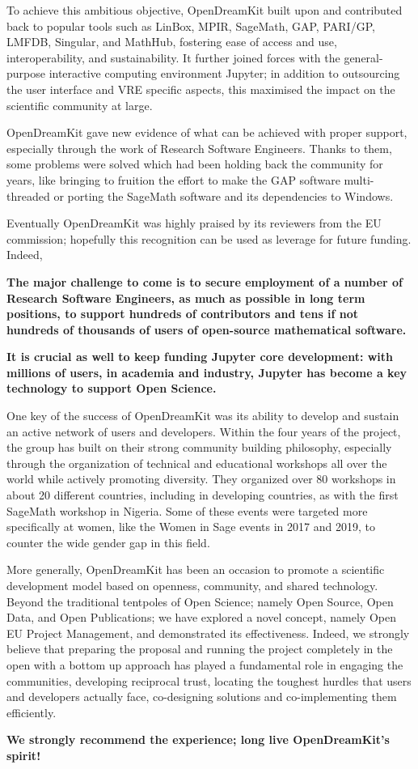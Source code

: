 To achieve this ambitious objective, OpenDreamKit built upon and contributed back to popular tools such as LinBox, MPIR, 
SageMath, GAP, PARI/GP, LMFDB, Singular, and MathHub, fostering ease of access and use, interoperability, and sustainability. 
It further joined forces with the general-purpose interactive computing environment Jupyter; in addition to outsourcing the 
user interface and VRE specific aspects, this maximised the impact on the scientific community at large.

OpenDreamKit gave new evidence of what can be achieved with proper support, especially through the work of Research 
Software Engineers. Thanks to them, some problems were solved which had been holding back the community for years, 
like bringing to fruition the effort to make the GAP software multi-threaded or porting the SageMath software and 
its dependencies to Windows.

Eventually OpenDreamKit was highly praised by its reviewers from the EU commission; hopefully this recognition 
can be used as leverage for future funding. Indeed, 

\textbf{The major challenge to come is to secure employment of a number of Research Software Engineers, as much as possible
 in long term positions, to support hundreds of contributors and tens if not hundreds of thousands of users of open-source 
mathematical software.}

\textbf{It is crucial as well to keep funding Jupyter core development: with millions of users, in academia and industry,
 Jupyter has become a key technology to support Open Science.}

One key of the success of OpenDreamKit was its ability to develop and sustain an active network of users and developers. 
Within the four years of the project, the group has built on their strong community building philosophy, especially through 
the organization of technical and educational workshops all over the world while actively promoting diversity. They organized
 over 80 workshops in about 20 different countries, including in developing countries, as with the first SageMath workshop 
in Nigeria. Some of these events were targeted more specifically at women, like the Women in Sage events in 2017 and 2019,
 to counter the wide gender gap in this field.

More generally, OpenDreamKit has been an occasion to promote a scientific development model based on openness, community,
 and shared technology. Beyond the traditional tentpoles of Open Science; namely Open Source, Open Data, and Open Publications;
 we have explored a novel concept, namely Open EU Project Management, and demonstrated its effectiveness. Indeed, we strongly
 believe that preparing the proposal and running the project completely in the open with a bottom up approach has played a 
fundamental role in engaging the communities, developing reciprocal trust, locating the toughest hurdles that users and 
developers actually face, co-designing solutions and co-implementing them efficiently.

\textbf{We strongly recommend the experience; long live OpenDreamKit’s spirit!}
